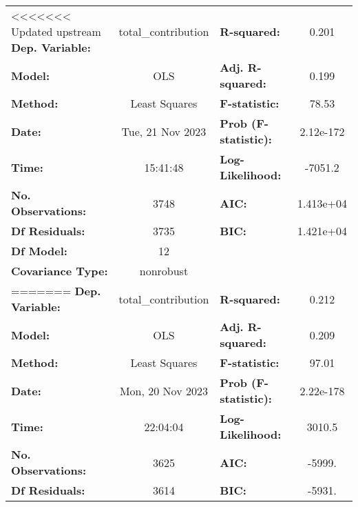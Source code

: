 \begin{center}
\begin{tabular}{lclc}
\toprule
<<<<<<< Updated upstream
\textbf{Dep. Variable:}                   & total\_contribution & \textbf{  R-squared:         } &     0.201   \\
\textbf{Model:}                           &         OLS         & \textbf{  Adj. R-squared:    } &     0.199   \\
\textbf{Method:}                          &    Least Squares    & \textbf{  F-statistic:       } &     78.53   \\
\textbf{Date:}                            &   Tue, 21 Nov 2023  & \textbf{  Prob (F-statistic):} & 2.12e-172   \\
\textbf{Time:}                            &       15:41:48      & \textbf{  Log-Likelihood:    } &   -7051.2   \\
\textbf{No. Observations:}                &          3748       & \textbf{  AIC:               } & 1.413e+04   \\
\textbf{Df Residuals:}                    &          3735       & \textbf{  BIC:               } & 1.421e+04   \\
\textbf{Df Model:}                        &            12       & \textbf{                     } &             \\
\textbf{Covariance Type:}                 &      nonrobust      & \textbf{                     } &             \\
=======
\textbf{Dep. Variable:}                  & total\_contribution & \textbf{  R-squared:         } &     0.212   \\
\textbf{Model:}                          &         OLS         & \textbf{  Adj. R-squared:    } &     0.209   \\
\textbf{Method:}                         &    Least Squares    & \textbf{  F-statistic:       } &     97.01   \\
\textbf{Date:}                           &   Mon, 20 Nov 2023  & \textbf{  Prob (F-statistic):} & 2.22e-178   \\
\textbf{Time:}                           &       22:04:04      & \textbf{  Log-Likelihood:    } &    3010.5   \\
\textbf{No. Observations:}               &          3625       & \textbf{  AIC:               } &    -5999.   \\
\textbf{Df Residuals:}                   &          3614       & \textbf{  BIC:               } &    -5931.   \\

\end{tabular}
\end{center}
